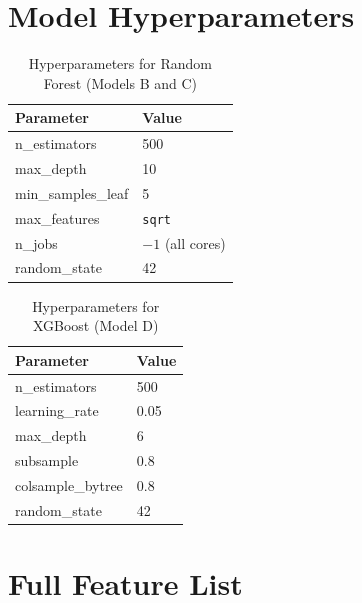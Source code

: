\documentclass[12pt, a4paper, oneside]{report}
\begin{document}











\begin{appendices}
\chapter{Model Hyperparameters}
\label{app:hyperparams}

\begin{table}[H]
\centering
\caption{Hyperparameters for Random Forest (Models B and C)}
\begin{tabular}{ll}
\toprule
\textbf{Parameter} & \textbf{Value} \\
\midrule
n\_estimators   & 500 \\
max\_depth      & 10  \\
min\_samples\_leaf & 5 \\
max\_features   & \texttt{sqrt} \\
n\_jobs         & $-1$ (all cores) \\
random\_state   & 42 \\
\bottomrule
\end{tabular}
\end{table}

\begin{table}[H]
\centering
\caption{Hyperparameters for XGBoost (Model D)}
\begin{tabular}{ll}
\toprule
\textbf{Parameter} & \textbf{Value} \\
\midrule
n\_estimators     & 500 \\
learning\_rate    & 0.05 \\
max\_depth        & 6 \\
subsample         & 0.8 \\
colsample\_bytree & 0.8 \\
random\_state     & 42 \\
\bottomrule
\end{tabular}
\end{table}

\chapter{Full Feature List}
\label{app:features}


\end{appendices}
\end{document}
